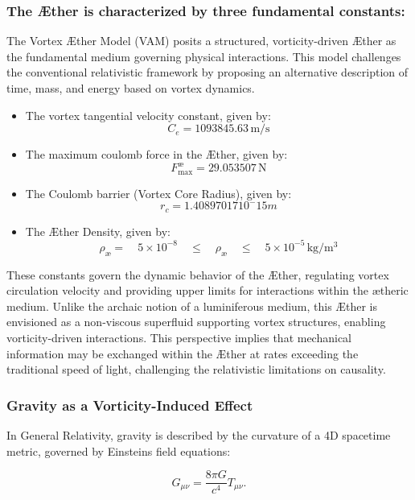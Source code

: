 \subsubsection*{The Æther is characterized by three fundamental constants:}\label{subsec:the-ae-ther-is-characterized-by-three-fundamental-constants:}

The Vortex Æther Model (VAM) posits a structured, vorticity-driven Æther as the fundamental medium governing physical interactions.
This model challenges the conventional relativistic framework by proposing an alternative description of time, mass, and energy based on vortex dynamics.

\begin{itemize}
    \item The vortex tangential velocity constant, given by: \[C_e = 1093845.63 \, \mathrm{m/s}\]
    \item The maximum coulomb force in the Æther, given by:\[F^{\text{\ae}}_{\text{max}} = 29.053507 \, \mathrm{N}\]
    \item The Coulomb barrier (Vortex Core Radius), given by: \[r_c = 1.40897017 10^-15 m\]
    \item The Æther Density, given by: \[\rho_\text{\ae} = \quad 5 \times 10^{-8} \quad \leq \quad \rho_\text{\ae} \quad \leq \quad 5 \times 10^{-5} \, \mathrm{kg/m^3}\]
\end{itemize}

These constants govern the dynamic behavior of the Æther, regulating vortex circulation velocity and providing upper limits for interactions within the ætheric medium.
Unlike the archaic notion of a luminiferous medium, this Æther is envisioned as a non-viscous superfluid supporting vortex structures, enabling vorticity-driven interactions.
This perspective implies that mechanical information may be exchanged within the Æther at rates exceeding the traditional speed of light, challenging the relativistic limitations on causality.


    \subsubsection*{Gravity as a Vorticity-Induced Effect}

    In General Relativity, gravity is described by the curvature of a 4D spacetime metric, governed by Einstein\rqs s field equations:

    \begin{equation*}
        G_{\mu\nu} = \frac{8\pi G}{c^4} T_{\mu\nu}.
    \end{equation*}

